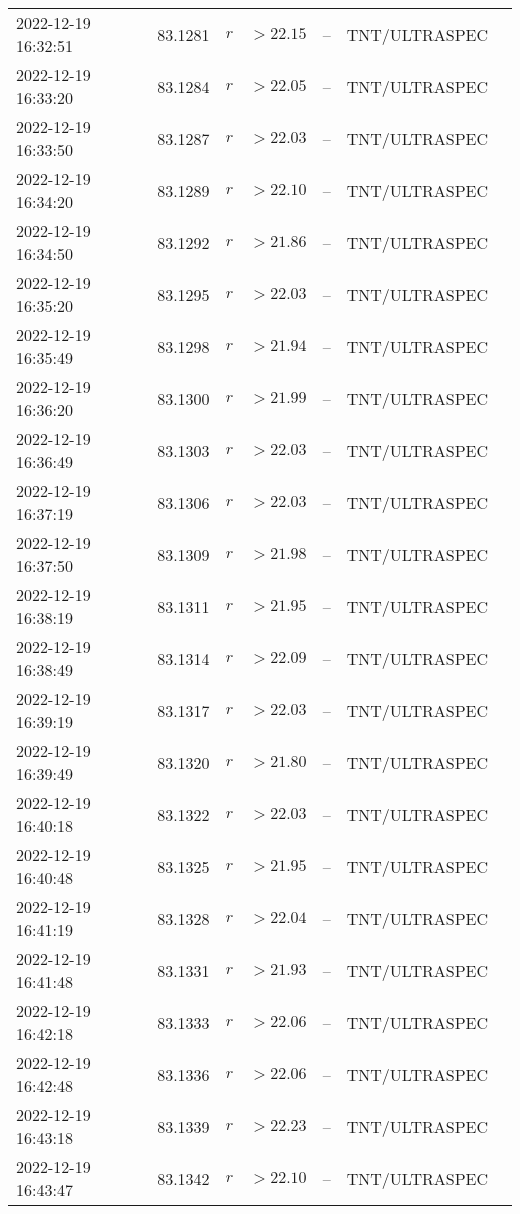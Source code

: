 \documentclass{nature_plusfigure}
\begin{document}
\begin{supplement}
\begin{center}
\begin{longtable}{lllllll}
2022-12-19 16:32:51 & 83.1281 & $r$ & $>22.15$ & -- & TNT/ULTRASPEC &  \\ 
2022-12-19 16:33:20 & 83.1284 & $r$ & $>22.05$ & -- & TNT/ULTRASPEC &  \\ 
2022-12-19 16:33:50 & 83.1287 & $r$ & $>22.03$ & -- & TNT/ULTRASPEC &  \\ 
2022-12-19 16:34:20 & 83.1289 & $r$ & $>22.10$ & -- & TNT/ULTRASPEC &  \\ 
2022-12-19 16:34:50 & 83.1292 & $r$ & $>21.86$ & -- & TNT/ULTRASPEC &  \\ 
2022-12-19 16:35:20 & 83.1295 & $r$ & $>22.03$ & -- & TNT/ULTRASPEC &  \\ 
2022-12-19 16:35:49 & 83.1298 & $r$ & $>21.94$ & -- & TNT/ULTRASPEC &  \\ 
2022-12-19 16:36:20 & 83.1300 & $r$ & $>21.99$ & -- & TNT/ULTRASPEC &  \\ 
2022-12-19 16:36:49 & 83.1303 & $r$ & $>22.03$ & -- & TNT/ULTRASPEC &  \\ 
2022-12-19 16:37:19 & 83.1306 & $r$ & $>22.03$ & -- & TNT/ULTRASPEC &  \\ 
2022-12-19 16:37:50 & 83.1309 & $r$ & $>21.98$ & -- & TNT/ULTRASPEC &  \\ 
2022-12-19 16:38:19 & 83.1311 & $r$ & $>21.95$ & -- & TNT/ULTRASPEC &  \\ 
2022-12-19 16:38:49 & 83.1314 & $r$ & $>22.09$ & -- & TNT/ULTRASPEC &  \\ 
2022-12-19 16:39:19 & 83.1317 & $r$ & $>22.03$ & -- & TNT/ULTRASPEC &  \\ 
2022-12-19 16:39:49 & 83.1320 & $r$ & $>21.80$ & -- & TNT/ULTRASPEC &  \\ 
2022-12-19 16:40:18 & 83.1322 & $r$ & $>22.03$ & -- & TNT/ULTRASPEC &  \\ 
2022-12-19 16:40:48 & 83.1325 & $r$ & $>21.95$ & -- & TNT/ULTRASPEC &  \\ 
2022-12-19 16:41:19 & 83.1328 & $r$ & $>22.04$ & -- & TNT/ULTRASPEC &  \\ 
2022-12-19 16:41:48 & 83.1331 & $r$ & $>21.93$ & -- & TNT/ULTRASPEC &  \\ 
2022-12-19 16:42:18 & 83.1333 & $r$ & $>22.06$ & -- & TNT/ULTRASPEC &  \\ 
2022-12-19 16:42:48 & 83.1336 & $r$ & $>22.06$ & -- & TNT/ULTRASPEC &  \\ 
2022-12-19 16:43:18 & 83.1339 & $r$ & $>22.23$ & -- & TNT/ULTRASPEC &  \\ 
2022-12-19 16:43:47 & 83.1342 & $r$ & $>22.10$ & -- & TNT/ULTRASPEC &  \\ 

\end{longtable}
\end{center}
\end{supplement}
\end{document}
